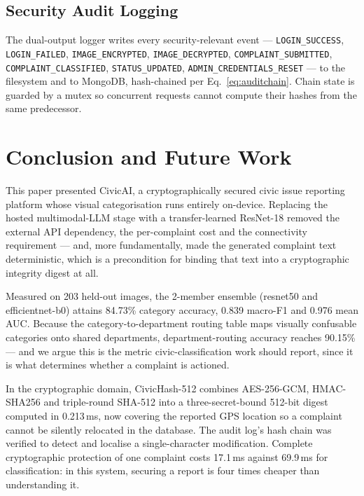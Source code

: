 \documentclass[conference]{IEEEtran}
\begin{document}
\subsection{Security Audit Logging}
The dual-output logger writes every security-relevant event --- \texttt{LOGIN\_SUCCESS}, \texttt{LOGIN\_FAILED}, \texttt{IMAGE\_ENCRYPTED}, \texttt{IMAGE\_DECRYPTED}, \texttt{COMPLAINT\_SUBMITTED}, \texttt{COMPLAINT\_CLASSIFIED}, \texttt{STATUS\_UPDATED}, \texttt{ADMIN\_CREDENTIALS\_RESET} --- to the filesystem and to MongoDB, hash-chained per Eq.~\ref{eq:auditchain}. Chain state is guarded by a mutex so concurrent requests cannot compute their hashes from the same predecessor.

\section{Conclusion and Future Work}
\label{sec:conclusion}
This paper presented CivicAI, a cryptographically secured civic issue reporting platform whose visual categorisation runs entirely on-device. Replacing the hosted multimodal-LLM stage with a transfer-learned ResNet-18 removed the external API dependency, the per-complaint cost and the connectivity requirement --- and, more fundamentally, made the generated complaint text deterministic, which is a precondition for binding that text into a cryptographic integrity digest at all.

Measured on 203 held-out images, the 2-member ensemble (resnet50 and efficientnet-b0) attains 84.73\% category accuracy, 0.839 macro-F1 and 0.976 mean AUC. Because the category-to-department routing table maps visually confusable categories onto shared departments, department-routing accuracy reaches 90.15\% --- and we argue this is the metric civic-classification work should report, since it is what determines whether a complaint is actioned.

In the cryptographic domain, CivicHash-512 combines AES-256-GCM, HMAC-SHA256 and triple-round SHA-512 into a three-secret-bound 512-bit digest computed in 0.213\,ms, now covering the reported GPS location so a complaint cannot be silently relocated in the database. The audit log's hash chain was verified to detect and localise a single-character modification. Complete cryptographic protection of one complaint costs 17.1\,ms against 69.9\,ms for classification: in this system, securing a report is four times cheaper than understanding it.
\end{document}
